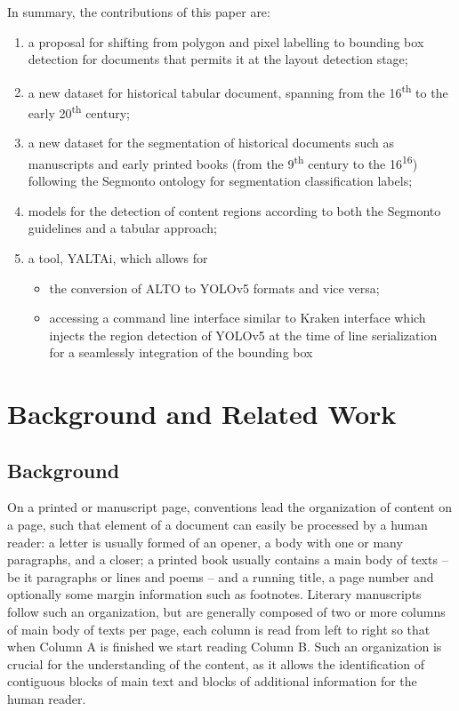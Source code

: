 \documentclass{jdmdh}
\begin{document}
In summary, the contributions of this paper are:

\begin{enumerate}
    \item a proposal for shifting from polygon and pixel labelling to bounding box detection for documents that permits it at the layout detection stage;
    \item a new dataset for historical tabular document, spanning from the 16\textsuperscript{th} to the early 20\textsuperscript{th} century;
    \item a new dataset for the segmentation of historical documents such as manuscripts and early printed books (from the 9\textsuperscript{th} century to the 16\textsuperscript{16}) following the Segmonto ontology for segmentation classification labels;
    \item models for the detection of content regions according to both the Segmonto guidelines and a tabular approach;
    \item a tool, YALTAi, which allows for  \begin{itemize}
        \item the conversion of ALTO to YOLOv5 formats and vice versa;
        \item accessing a command line interface similar to Kraken interface which injects the region detection of YOLOv5 at the time of line serialization for a seamlessly integration of the bounding box 
    \end{itemize}
\end{enumerate}

\section{Background and Related Work}
\label{sec:related}

\subsection{Background}

On a printed or manuscript page, conventions lead the organization of content on a page, such that element of a document can easily be processed by a human reader: a letter is usually formed of an opener, a body with one or many paragraphs, and a closer; a printed book usually contains a main body of texts -- be it paragraphs or lines and poems -- and a running title, a page number and optionally some margin information such as footnotes. Literary manuscripts follow such an organization, but are generally composed of two or more columns of main body of texts per page, each column is read from left to right so that when Column A is finished we start reading Column B. Such an organization is crucial for the understanding of the content, as it allows the identification of contiguous blocks of main text and blocks of additional information for the human reader.
\end{document}
